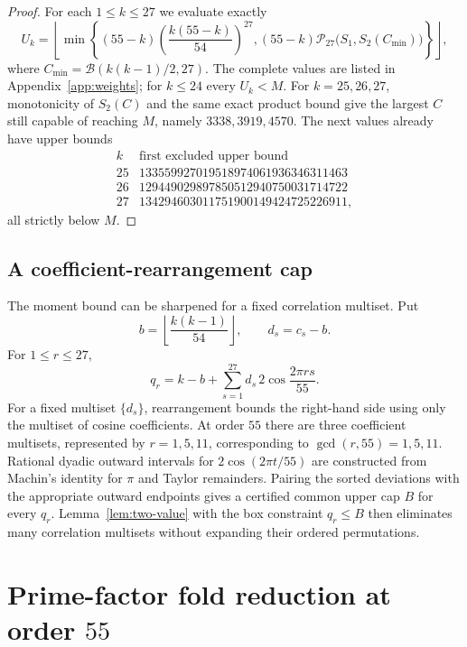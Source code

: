 \documentclass[11pt,a4paper]{article}
\theoremstyle{definition}
\theoremstyle{remark}
\begin{document}
\begin{proof}
For each $1\le k\le27$ we evaluate exactly
\begin{equation}
\label{eq:Uk}
 U_k=\left\lfloor\min\left\{
 (55-k)\left(\frac{k(55-k)}{54}\right)^{27},
 (55-k)\mathcal P_{27}\bigl(S_1,S_2(C_{\min})\bigr)
 \right\}\right\rfloor,
\end{equation}
where $C_{\min}=\mathcal B(k(k-1)/2,27)$.  The complete values are listed in
Appendix~\ref{app:weights}; for $k\le24$ every $U_k<M$.  For
$k=25,26,27$, monotonicity of $S_2(C)$ and the same exact product bound give
the largest $C$ still capable of reaching $M$, namely $3338,3919,4570$.
The next values already have upper bounds
\[
\begin{array}{c|c}
 k & \text{first excluded upper bound}\\
\hline
25&133559927019518974061936346311463\\
26&129449029897850512940750031714722\\
27&134294603011751900149424725226911,
\end{array}
\]
all strictly below $M$.
\end{proof}

\subsection{A coefficient-rearrangement cap}
\label{subsec:cap}

The moment bound can be sharpened for a fixed correlation multiset.  Put
\[
  b=\left\lfloor\frac{k(k-1)}{54}\right\rfloor,
  \qquad d_s=c_s-b.
\]
For $1\le r\le27$,
\begin{equation}
\label{eq:q-deviation}
 q_r=k-b+\sum_{s=1}^{27}d_s\,2\cos\frac{2\pi rs}{55}.
\end{equation}
For a fixed multiset $\{d_s\}$, rearrangement bounds the right-hand side using
only the multiset of cosine coefficients.  At order $55$ there are three
coefficient multisets, represented by $r=1,5,11$, corresponding to
$\gcd(r,55)=1,5,11$.  Rational dyadic outward intervals for
$2\cos(2\pi t/55)$ are constructed from Machin's identity for $\pi$ and
Taylor remainders.  Pairing the sorted deviations with the appropriate
outward endpoints gives a certified common upper cap $B$ for every $q_r$.
Lemma~\ref{lem:two-value} with the box constraint $q_r\le B$ then eliminates
many correlation multisets without expanding their ordered permutations.

\section{Prime-factor fold reduction at order \texorpdfstring{$55$}{55}}
\label{sec:fold55}
\end{document}
